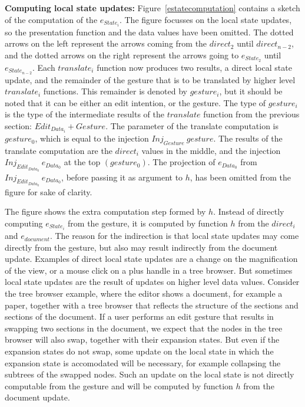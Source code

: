 {\bf  Computing local state updates: }Figure~\ref{estatecomputation} contains a sketch of the computation of the $e_{State_i}$. The figure focusses on the local state updates, so the presentation function and the data values have been omitted. The dotted arrows on the left represent the arrows coming from the $direct_2$ until $direct_{n-2}$, and the dotted arrows on the right represent the arrows going to $e_{State_2}$ until $e_{State_{n-2}}$. Each $translate_i$ function now produces two results, a direct local state update, and the remainder of the gesture that is to be translated by higher level $translate_i$ functions. This remainder is denoted by $gesture_i$, but it should be noted that it can be either an edit intention, or the gesture. The type of $gesture_i$ is the type of the intermediate results of the $translate$ function from the previous section: $Edit_{Data_i}+Gesture$. The parameter of the translate computation is $gesture_0$, which is equal to the injection $Inj_{Gesture}~gesture$. The results of the translate computation are the $direct_i$ values in the middle, and the injection $Inj_{Edit_{Data_0}}~e_{Data_0}$ at the top $(gesture_0)$. The projection of $e_{Data_0}$ from $Inj_{Edit_{Data_0}}~e_{Data_0}$, before passing it as argument to $h$, has been omitted from the figure for sake of clarity.

The figure shows the extra computation step formed by $h$. Instead of directly computing $e_{State_i}$ from the gesture, it is computed by function $h$ from the $direct_i$ and $e_{document}$. The reason for the indirection is that local state updates may come directly from the gesture, but also may result indirectly from the document update. Examples of direct local state updates are a change on the magnification of the view, or a mouse click on a plus handle in a tree browser. But sometimes local state updates are the result of updates on higher level data values. Consider the tree browser example, where the editor shows a document, for example a paper, together with a tree browser that reflects the structure of the sections and sections of the document. If a user performs an edit gesture that results in swapping two sections in the document, we expect that the nodes in the tree browser will also swap, together with their expansion states. But even if the expansion states do not swap, some update on the local state in which the expansion state is accomodated will be necessary, for example collapsing the subtrees of the swapped nodes. Such an update on the local state is not directly computable from the gesture and will be computed by function $h$ from the document update.

